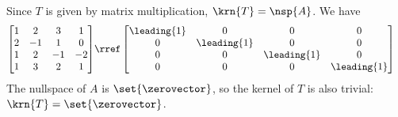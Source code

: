 Since $T$ is given by matrix multiplication, $\krn{T} = \nsp{A}$.  We have
%
\begin{align*}
\begin{bmatrix} 
1 & 2 & 3 & 1\\ 
2 & -1 & 1 & 0\\ 
1 & 2 & -1 & -2 \\ 
1 & 3 & 2 & 1 
\end{bmatrix} 
&\rref 
\begin{bmatrix} 
\leading{1} & 0 & 0 & 0\\ 
0 & \leading{1} & 0 & 0\\ 
0 & 0 & \leading{1} & 0\\ 
0 & 0 & 0 & \leading{1}
\end{bmatrix}
\end{align*}
%
The nullspace of $A$ is $\set{\zerovector}$, so the kernel of $T$ is also trivial:  $\krn{T} = \set{\zerovector}$.